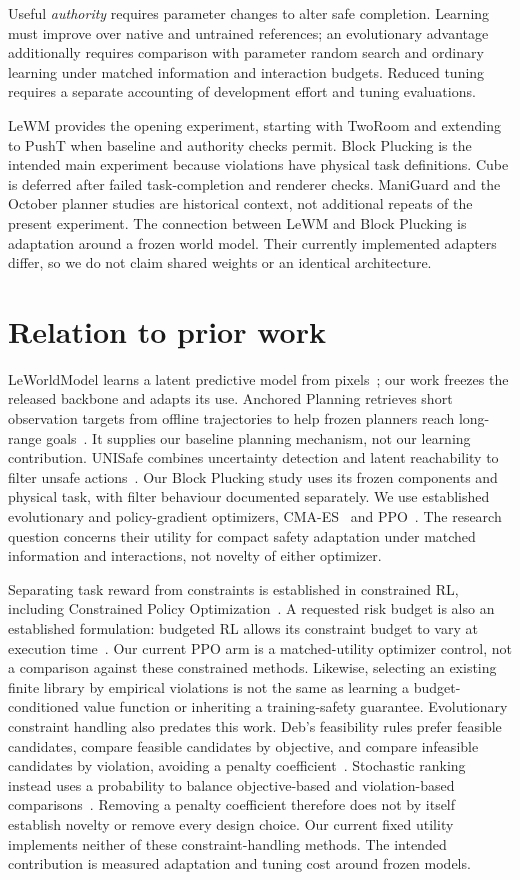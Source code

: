 \documentclass[sigconf,nonacm]{acmart}
\begin{document}
Useful \emph{authority} requires parameter changes to alter safe completion.
Learning must improve over native and untrained references; an evolutionary
advantage additionally requires comparison with parameter random search and
ordinary learning under matched information and interaction budgets. Reduced
tuning requires a separate accounting of development effort and tuning evaluations.

LeWM provides the opening experiment, starting with TwoRoom and extending to PushT
when baseline and authority checks permit. Block Plucking is the intended main
experiment because violations have physical task definitions. Cube is deferred
after failed task-completion and renderer checks. ManiGuard and the October planner
studies are historical context, not additional repeats of the present experiment.
The connection between LeWM and Block Plucking is adaptation around a frozen world
model. Their currently implemented adapters differ, so we do not claim shared
weights or an identical architecture.

\section{Relation to prior work}
LeWorldModel learns a latent predictive model from pixels~\cite{lewm}; our work
freezes the released backbone and adapts its use. Anchored Planning retrieves
short observation targets from offline trajectories to help frozen planners reach
long-range goals~\cite{ap}. It supplies our baseline planning mechanism, not our
learning contribution. UNISafe combines uncertainty detection and latent
reachability to filter unsafe actions~\cite{unisafe}. Our Block Plucking study
uses its frozen components and physical task, with filter behaviour documented
separately. We use established evolutionary and policy-gradient optimizers,
CMA-ES~\cite{cma} and PPO~\cite{ppo}. The research question concerns their utility
for compact safety adaptation under matched information and interactions, not
novelty of either optimizer.

Separating task reward from constraints is established in constrained RL, including
Constrained Policy Optimization~\cite{cpo}. A requested risk budget is also an
established formulation: budgeted RL allows its constraint budget to vary at
execution time~\cite{budgeted}. Our current PPO arm is a matched-utility optimizer
control, not a comparison against these constrained methods. Likewise, selecting
an existing finite library by empirical violations is not the same as learning a
budget-conditioned value function or inheriting a training-safety guarantee.
Evolutionary constraint handling also predates this work. Deb's feasibility rules
prefer feasible candidates, compare feasible candidates by objective, and compare
infeasible candidates by violation, avoiding a penalty coefficient~\cite{deb}.
Stochastic ranking instead uses a probability to balance objective-based and
violation-based comparisons~\cite{ranking}. Removing a penalty coefficient therefore
does not by itself establish novelty or remove every design choice. Our current
fixed utility implements neither of these constraint-handling methods. The intended
contribution is measured adaptation and tuning cost around frozen models.
\end{document}
